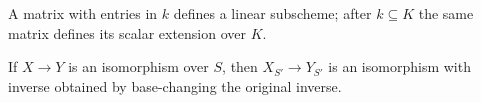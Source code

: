 \begin{example}\label{ex:vi24-r19}
A matrix with entries in $k$ defines a linear subscheme; after $k\subseteq K$ the same matrix defines its scalar extension over $K$.
\end{example}

\begin{example}\label{ex:vi24-r20}
If $X\to Y$ is an isomorphism over $S$, then $X_{S'}\to Y_{S'}$ is an isomorphism with inverse obtained by base-changing the original inverse.
\end{example}
